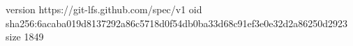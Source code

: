version https://git-lfs.github.com/spec/v1
oid sha256:6acaba019d8137292a86c5718d0f54db0ba33d68c91ef3e0e32d2a86250d2923
size 1849
